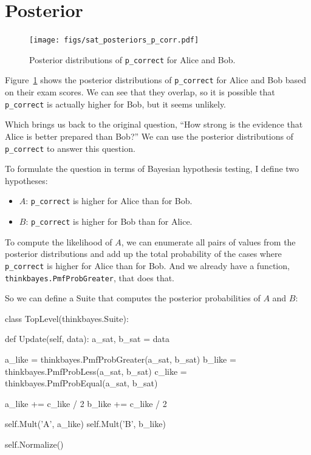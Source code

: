 \documentclass[12pt]{book}
\theoremstyle{exercise}
\begin{document}
\section{Posterior}

\begin{figure}
\centerline{\texttt{[image: figs/sat\_posteriors\_p\_corr.pdf]}}
\caption{Posterior distributions of {\tt p\_correct} for Alice and Bob.}
\label{fig.satposterior1}
\end{figure}

Figure~\ref{fig.satposterior1} shows the posterior distributions
of \verb"p_correct" for Alice and Bob based on their exam scores.
We can see that they overlap, so it is possible that \verb"p_correct"
is actually higher for Bob, but it seems unlikely.

Which brings us back to the original question, ``How strong is the
evidence that Alice is better prepared than Bob?''  We can use the
posterior distributions of \verb"p_correct" to answer this question.

To formulate the question in terms of Bayesian hypothesis testing,
I define two hypotheses:

\begin{itemize}

\item $A$: \verb"p_correct" is higher for Alice than for Bob.

\item $B$: \verb"p_correct" is higher for Bob than for Alice.

\end{itemize}

To compute the likelihood of $A$, we can enumerate all pairs of values
from the posterior distributions and add up the total probability of
the cases where \verb"p_correct" is higher for Alice than for Bob.
And we already have a function, \verb"thinkbayes.PmfProbGreater",
that does that.

So we can define a Suite that computes the posterior probabilities
of $A$ and $B$:

\begin{code}
class TopLevel(thinkbayes.Suite):

    def Update(self, data):
        a_sat, b_sat = data

        a_like = thinkbayes.PmfProbGreater(a_sat, b_sat)
        b_like = thinkbayes.PmfProbLess(a_sat, b_sat)
        c_like = thinkbayes.PmfProbEqual(a_sat, b_sat)

        a_like += c_like / 2
        b_like += c_like / 2

        self.Mult('A', a_like)
        self.Mult('B', b_like)

        self.Normalize()
\end{code}
\end{document}
